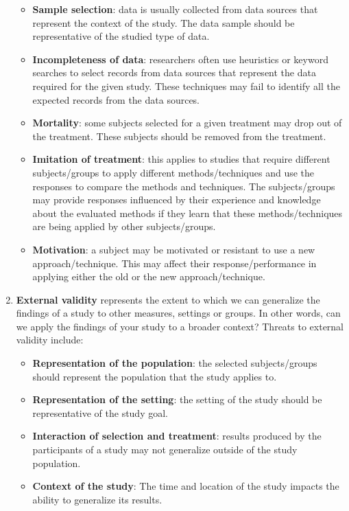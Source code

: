 \begin{enumerate}
\begin{itemize}
        \item \textbf{Sample selection}: data is usually collected from data sources that represent the context of the study. The data sample should be representative of the studied type of data.
        \item \textbf{Incompleteness of data}: researchers often use heuristics or keyword searches to select records from data sources that represent the data required for the given study. These techniques may fail to identify all the expected records from the data sources.
        \item \textbf{Mortality}: some subjects selected for a given treatment may drop out of the treatment. These subjects should be removed from the treatment.
        \item \textbf{Imitation of treatment}: this applies to studies that require different subjects/groups to apply different methods/techniques and use the responses to compare the methods and techniques. The subjects/groups may provide responses influenced by their experience and knowledge about the evaluated methods if they learn that these methods/techniques are being applied by other subjects/groups.
        \item \textbf{Motivation}: a subject may be motivated or resistant to use a new approach/technique. This may affect their response/performance in applying either the old or the new approach/technique.
    \end{itemize}

    \item \textbf{External validity} represents the extent to which we can generalize the findings of a study to other measures, settings or groups. In other words, can we apply the findings of your study to a broader context?
    Threats to external validity include: 
    \begin{itemize}
        \item \textbf{Representation of the population}: the selected subjects/groups should represent the population that the study applies to.
        \item \textbf{Representation of the setting}: the setting of the study should be representative of the study goal.
        \item \textbf{Interaction of selection and treatment}: results produced by the participants of a study may not generalize outside of the study population.
        \item \textbf{Context of the study}: The time and location of the study impacts the ability to generalize its results.
    \end{itemize}



\end{enumerate}

